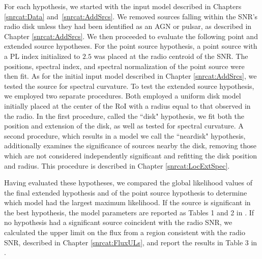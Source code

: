 For each hypothesis, we started with the input model described in Chapters \ref{snrcat:Data} and~\ref{snrcat:AddSrcs}. We removed sources falling within the SNR's radio disk unless they had been identified as an AGN or pulsar, as described in Chapter \ref{snrcat:AddSrcs}. We then proceeded to evaluate the following point and extended source hypotheses. For the point source hypothesis, a point source with a PL index initialized to $2.5$ was placed at the radio centroid of the SNR. The positions, spectral index, and spectral normalization of the point source were then fit. As for the initial input model described in Chapter \ref{snrcat:AddSrcs}, we tested the source for spectral curvature. To test the extended source hypothesis, we employed two separate procedures. Both employed a uniform disk model initially placed at the center of the RoI with a radius equal to that observed in the radio. In the first procedure, called the ``disk" hypothesis, we fit both the position and extension of the disk, as well as tested for spectral curvature. A second procedure, which results in a model we call the ``neardisk" hypothesis, additionally examines the significance of sources nearby the disk, removing those which are not considered independently significant and refitting the disk position and radius. This procedure is described in Chapter \ref{snrcat:LocExtSpec}.

Having evaluated these hypotheses, we compared the global likelihood values of the final extended hypothesis and of the point source hypothesis to determine which model had the largest maximum likelihood. If the source is significant in the best hypothesis, the model parameters are reported as Tables 1 and 2 in \cite{snrCat} . If no hypothesis had a significant \gam{} source coincident with the radio SNR, we calculated the upper limit on the flux from a region consistent with the radio SNR, described in Chapter \ref{snrcat:FluxULs}, and report  the results in Table 3 in \cite{snrCat}. 

